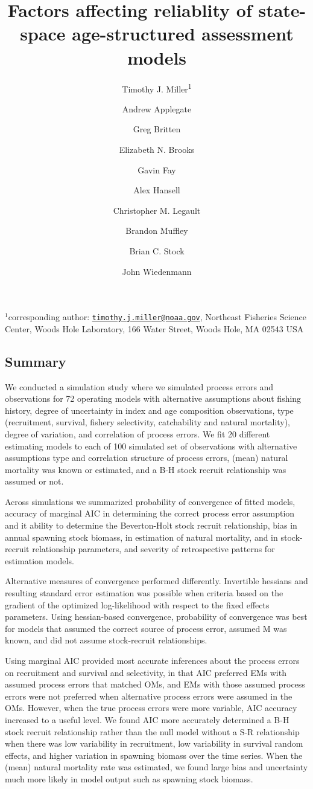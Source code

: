 \documentclass[
  12pt,
]{article}
\title{Factors affecting reliablity of state-space age-structured
assessment models}
\author{Timothy J. Miller\textsuperscript{1} \and Andrew
Applegate \and Greg Britten \and Elizabeth N. Brooks \and Gavin
Fay \and Alex Hansell \and Christopher M. Legault \and Brandon
Muffley \and Brian C. Stock \and John Wiedenmann}
\date{}
\begin{document}
\maketitle

\(^1\)corresponding author:
\href{mailto:timothy.j.miller@noaa.gov}{\nolinkurl{timothy.j.miller@noaa.gov}},
Northeast Fisheries Science Center, Woods Hole Laboratory, 166 Water
Street, Woods Hole, MA 02543 USA\\

\pagebreak

\hypertarget{summary}{%
\subsection*{Summary}\label{summary}}

We conducted a simulation study where we simulated process errors and
observations for 72 operating models with alternative assumptions about
fishing history, degree of uncertainty in index and age composition
observations, type (recruitment, survival, fishery selectivity,
catchability and natural mortality), degree of variation, and
correlation of process errors. We fit 20 different estimating models to
each of 100 simulated set of observations with alternative assumptions
type and correlation structure of process errors, (mean) natural
mortality was known or estimated, and a B-H stock recruit relationship
was assumed or not.

Across simulations we summarized probability of convergence of fitted
models, accuracy of marginal AIC in determining the correct process
error assumption and it ability to determine the Beverton-Holt stock
recruit relationship, bias in annual spawning stock biomass, in
estimation of natural mortality, and in stock-recruit relationship
parameters, and severity of retrospective patterns for estimation
models.

Alternative measures of convergence performed differently. Invertible
hessians and resulting standard error estimation was possible when
criteria based on the gradient of the optimized log-likelihood with
respect to the fixed effects parameters. Using hessian-based
convergence, probability of convergence was best for models that assumed
the correct source of process error, assumed M was known, and did not
assume stock-recruit relationships.

Using marginal AIC provided most accurate inferences about the process
errors on recruitment and survival and selectivity, in that AIC
preferred EMs with assumed process errors that matched OMs, and EMs with
those assumed process errors were not preferred when alternative process
errors were assumed in the OMs. However, when the true process errors
were more variable, AIC accuracy increased to a useful level. We found
AIC more accurately determined a B-H stock recruit relationship rather
than the null model without a S-R relationship when there was low
variability in recruitment, low variability in survival random effects,
and higher variation in spawning biomass over the time series. When the
(mean) natural mortality rate was estimated, we found large bias and
uncertainty much more likely in model output such as spawning stock
biomass.
\end{document}
